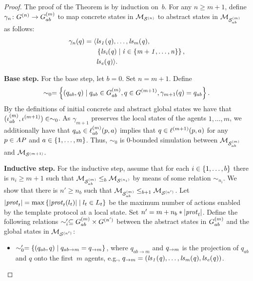 \documentclass{article}
\begin{document}
\begin{proof}

The proof of the Theorem is by induction on~$b$. For any $n \geq m+1$,  define
$\gamma_n \colon G^{(n)} \rightarrow G^{(m)}_{ab}$ to map concrete
states in $\mathcal{M}_{\mathcal{S}^{(n)}}$ to abstract states in $\mathcal{M}_{\mathcal{S}_{ab}^{(m)}}$ as follows:
\begin{align*}
  \gamma_n(q) =  \langle &\it{ls}_{1}(q), \ldots, \it{ls}_{m}(q), \\
  &\left \{ \it{ls}_{i}(q) \mid i \in \left \{ m + 1, \ldots, n \right \} \right \}, \\
  &\it{ls}_{e}(q)  \rangle.
\end{align*}

{\bf Base step.} For the base step, let $b = 0$. Set $n = m+1$. Define $$\sim_0 =
\left \{ (q_{ab}, q) \mid q_{ab} \in G^{(m)}_{ab}, q \in
G^{(m+1)}, \gamma_{m+1}(q) = q_{ab} \right \}.$$ 
By the definitions of
    initial concrete and abstract global states we have that $(\iota^{({m})}_{ab},
    \iota^{({m+1})}) \in \sim_0$.  
    As $\gamma_{m+1}$ preserves
the local states of the agents $1, \ldots, m$, we additionally have that $q_{ab} \in
\ell^{(m)}_{ab}(p, a)$ implies that $q \in \ell^{(m+1)}(p, a)$ for any $p \in
\it{AP}$ and $a \in \left \{ 1, \ldots, m \right \}$. Thus,  $\sim_0$ is $0$-bounded
simulation between $\mathcal{M}_{\mathcal{S}_{ab}^{(m)}}$ and $\mathcal{M}_{\mathcal{S}^{(m+1)}}$. 

{\bf Inductive step.} For the inductive step, assume that for each $i \in
    \left \{ 1, \ldots, b \right \}$ there is $n_i \geq m + 1$ such that $\mathcal{M}_{\mathcal{S}_{ab}^{(m)}} \leq_b \mathcal{M}_{\mathcal{S}^{(n_i)}}$
    by means of some relation $\sim_{n_i}$.
We show that there is $n' \geq n_b$ such that $\mathcal{M}_{\mathcal{S}_{ab}^{(m)}} \leq_{b+1} \mathcal{M}_{\mathcal{S}^{(n')}}$.
    Let $|\mathit{prot}_{t}| = \max \left \{ |\mathit{prot}_{t}(l_t)| \mid l_t \in L_{t} \right \}$ be the
    maximum number of actions enabled by the template protocol at a local
    state. Set $n' = m + n_b * |\mathit{prot}_{t}|$.  Define the following relations
    $\sim'_i \subseteq G^{(m)}_{ab} \times G^{(n')}$ between the
    abstract states in $G^{(m)}_{ab}$ and the global states in
    $\mathcal{M}_{\mathcal{S}^{(n')}}$:

\begin{itemize}

  \item  $\sim'_0 = \left \{ (q_{ab}, q) \mid  q_{ab \rightarrow m} =
  q_{\rightarrow m} \right \}$, where $q_{ab \rightarrow m}$ and $q_{\rightarrow m}$
  is the projection of $q_{ab}$ and $q$ onto the first~$m$ agents, e.g.,
  $q_{\rightarrow m} = \left ( \it{ls}_{1}(q), \ldots, \it{ls}_{m}(q), \it{ls}_{e}(q) \right )$.



\end{itemize}
\end{proof}
\end{document}
